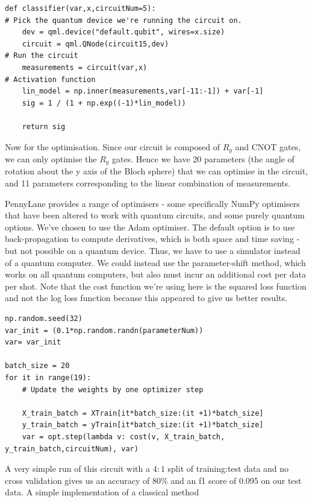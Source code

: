 \documentclass{article}
\theoremstyle{definition}
\begin{document}
\begin{verbatim}
def classifier(var,x,circuitNum=5):
# Pick the quantum device we're running the circuit on.
    dev = qml.device("default.qubit", wires=x.size)
    circuit = qml.QNode(circuit15,dev)
# Run the circuit
    measurements = circuit(var,x)
# Activation function
    lin_model = np.inner(measurements,var[-11:-1]) + var[-1] 
    sig = 1 / (1 + np.exp((-1)*lin_model))

    return sig
\end{verbatim}

Now for the optimisation. Since our circuit is composed of $R_y$ and CNOT gates, we can only optimise the $R_y$ gates. Hence we have 20 parameters (the angle of rotation about the y axis of the Bloch sphere) that we can optimise in the circuit, and 11 parameters corresponding to the linear combination of measurements.

PennyLane provides a range of optimisers - some specifically NumPy optimisers that have been altered to work with quantum circuits, and some purely quantum options. We've chosen to use the Adam optimiser. The default option is to use back-propagation to compute derivatives, which is both space and time saving - but not possible on a quantum device. Thus, we have to use a simulator instead of a quantum computer. We could instead use the parameter-shift method, which works on all quantum computers, but also must incur an additional cost per data per shot. Note that the cost function we're using here is the squared loss function and not the log loss function because this appeared to give us better results. 

\begin{verbatim}
np.random.seed(32)
var_init = (0.1*np.random.randn(parameterNum))
var= var_init 

batch_size = 20
for it in range(19):
    # Update the weights by one optimizer step

    X_train_batch = XTrain[it*batch_size:(it +1)*batch_size]
    y_train_batch = yTrain[it*batch_size:(it +1)*batch_size]
    var = opt.step(lambda v: cost(v, X_train_batch, y_train_batch,circuitNum), var)
\end{verbatim}

A very simple run of this circuit with a $4:1$ split of training:test data and no cross validation gives us an accuracy of 80\% and an f1 score of 0.095 on our test data. A simple implementation of a classical method
\end{document}
